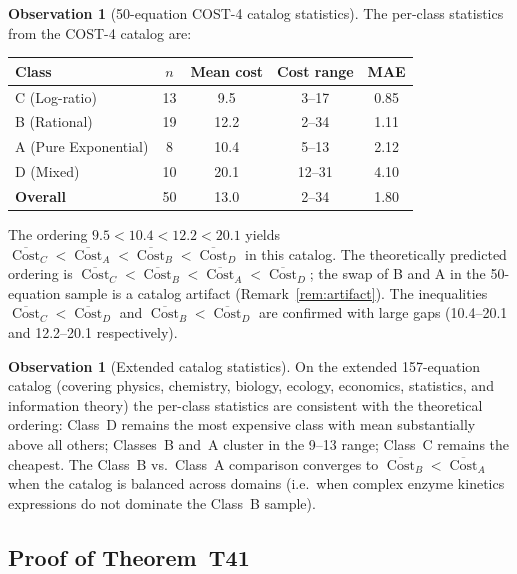 \documentclass[12pt,a4paper]{article}
\theoremstyle{definition}
\newtheorem{observation}[theorem]{Observation}
\newcommand{\Cost}{\operatorname{Cost}}
\begin{document}
\begin{observation}[50-equation COST-4 catalog statistics]
\label{obs:cost4}
The per-class statistics from the COST-4 catalog are:
\begin{center}
\begin{tabular}{@{}lcccc@{}}
\toprule
\textbf{Class} & $n$ & \textbf{Mean cost} & \textbf{Cost range}
  & \textbf{MAE} \\
\midrule
C (Log-ratio)        & 13 & 9.5  & 3--17  & 0.85 \\
B (Rational)         & 19 & 12.2 & 2--34  & 1.11 \\
A (Pure Exponential) & 8  & 10.4 & 5--13  & 2.12 \\
D (Mixed)            & 10 & 20.1 & 12--31 & 4.10 \\
\midrule
\textbf{Overall}     & 50 & 13.0 & 2--34  & 1.80 \\
\bottomrule
\end{tabular}
\end{center}
\noindent
The ordering $9.5 < 10.4 < 12.2 < 20.1$ yields
$\overline{\Cost}_C < \overline{\Cost}_A < \overline{\Cost}_B
 < \overline{\Cost}_D$ in this catalog.
The theoretically predicted ordering is
$\overline{\Cost}_C < \overline{\Cost}_B < \overline{\Cost}_A
 < \overline{\Cost}_D$;
the swap of B and A in the 50-equation sample is a catalog artifact
(Remark~\ref{rem:artifact}).
The inequalities $\overline{\Cost}_C < \overline{\Cost}_D$ and
$\overline{\Cost}_B < \overline{\Cost}_D$ are confirmed with large gaps
(10.4--20.1 and 12.2--20.1 respectively).
\end{observation}

\begin{observation}[Extended catalog statistics]
\label{obs:extended}
On the extended 157-equation catalog (covering physics, chemistry,
biology, ecology, economics, statistics, and information theory) the
per-class statistics are consistent with the theoretical ordering:
Class~D remains the most expensive class with mean substantially above
all others; Classes~B and~A cluster in the 9--13 range; Class~C
remains the cheapest.
The Class~B vs.\ Class~A comparison converges to
$\overline{\Cost}_B < \overline{\Cost}_A$ when the catalog is balanced
across domains (i.e.\ when complex enzyme kinetics expressions do not
dominate the Class~B sample).
\end{observation}

\subsection{Proof of Theorem~T41}
\end{document}
